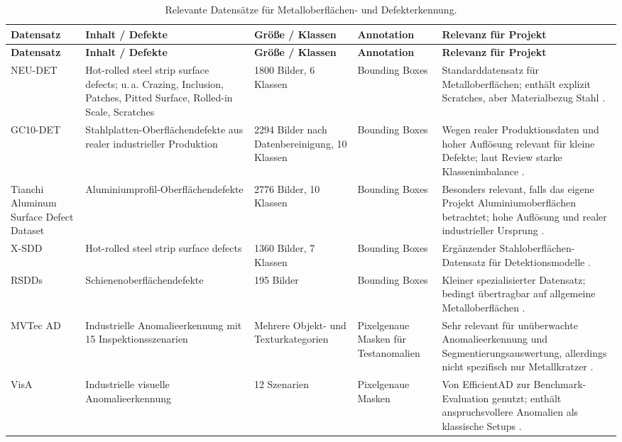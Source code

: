 \documentclass[11pt,a4paper]{article}
\begin{document}
\begin{longtable}{p{}p{}p{}p{}p{}}
\caption{Relevante Datensätze für Metalloberflächen- und Defekterkennung.}\\
\toprule
\textbf{Datensatz} & \textbf{Inhalt / Defekte} & \textbf{Größe / Klassen} & \textbf{Annotation} & \textbf{Relevanz für Projekt}\\
\midrule
\endfirsthead
\toprule
\textbf{Datensatz} & \textbf{Inhalt / Defekte} & \textbf{Größe / Klassen} & \textbf{Annotation} & \textbf{Relevanz für Projekt}\\
\midrule
\endhead
NEU-DET & Hot-rolled steel strip surface defects; u.\,a. Crazing, Inclusion, Patches, Pitted Surface, Rolled-in Scale, Scratches & 1800 Bilder, 6 Klassen & Bounding Boxes & Standarddatensatz für Metalloberflächen; enthält explizit Scratches, aber Materialbezug Stahl \cite{applications_review,ersteinfos}.\\
GC10-DET & Stahlplatten-Oberflächendefekte aus realer industrieller Produktion & 2294 Bilder nach Datenbereinigung, 10 Klassen & Bounding Boxes & Wegen realer Produktionsdaten und hoher Auflösung relevant für kleine Defekte; laut Review starke Klassenimbalance \cite{applications_review}.\\
Tianchi Aluminum Surface Defect Dataset & Aluminiumprofil-Oberflächendefekte & 2776 Bilder, 10 Klassen & Bounding Boxes & Besonders relevant, falls das eigene Projekt Aluminiumoberflächen betrachtet; hohe Auflösung und realer industrieller Ursprung \cite{applications_review}.\\
X-SDD & Hot-rolled steel strip surface defects & 1360 Bilder, 7 Klassen & Bounding Boxes & Ergänzender Stahloberflächen-Datensatz für Detektionsmodelle \cite{applications_review}.\\
RSDDs & Schienenoberflächendefekte & 195 Bilder & Bounding Boxes & Kleiner spezialisierter Datensatz; bedingt übertragbar auf allgemeine Metalloberflächen \cite{applications_review}.\\
MVTec AD & Industrielle Anomalieerkennung mit 15 Inspektionsszenarien & Mehrere Objekt- und Texturkategorien & Pixelgenaue Masken für Testanomalien & Sehr relevant für unüberwachte Anomalieerkennung und Segmentierungsauswertung, allerdings nicht spezifisch nur Metallkratzer \cite{efficientad}.\\
VisA & Industrielle visuelle Anomalieerkennung & 12 Szenarien & Pixelgenaue Masken & Von EfficientAD zur Benchmark-Evaluation genutzt; enthält anspruchsvollere Anomalien als klassische Setups \cite{efficientad}.\\

\end{longtable}
\end{document}
